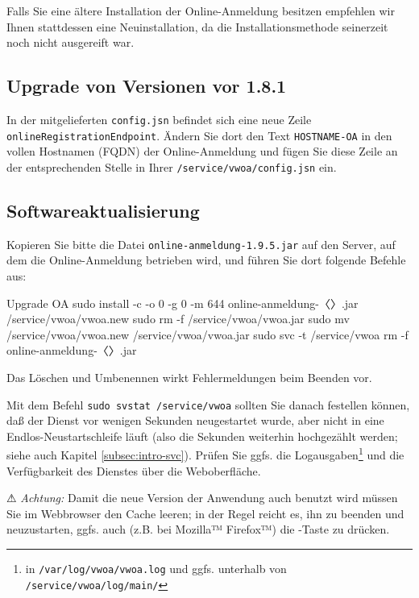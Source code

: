 \documentclass{tarentanleitung}
\newcommand{\vwiaverssw}{1.9.5}
\begin{document}
Falls Sie eine ältere Installation der Online-Anmeldung besitzen
empfehlen wir Ihnen stattdessen eine Neuinstallation, da die
Installationsmethode seinerzeit noch nicht ausgereift war.

\subsection{Upgrade von Versionen vor 1.8.1}\label{subsec:upgrade-oa-181}

In der mitgelieferten \texttt{config.jsn} befindet sich eine neue
Zeile \texttt{onlineRegistrationEndpoint}. Ändern Sie dort den Text
\texttt{HOSTNAME-OA} in den vollen Hostnamen (FQDN) der Online-Anmeldung
und fügen Sie diese Zeile an der entsprechenden Stelle in Ihrer
\texttt{/service/vwoa/config.jsn} ein.

\subsection{Softwareaktualisierung}\label{subsec:upgrade-oa-software}

\begin{minipage}{\linewidth}
Kopieren Sie bitte die Datei \texttt{online-anmeldung-\vwiaverssw{}.jar}
auf den Server, auf dem die Online-Anmeldung betrieben wird, und führen
Sie dort folgende Befehle aus:

\begin{lstdump}{Upgrade OA}
sudo install -c -o 0 -g 0 -m 644 online-anmeldung-〈\lstdumpesc{\vwiaverssw}〉.jar /service/vwoa/vwoa.new
sudo rm -f /service/vwoa/vwoa.jar
sudo mv /service/vwoa/vwoa.new /service/vwoa/vwoa.jar
sudo svc -t /service/vwoa
rm -f online-anmeldung-〈\lstdumpesc{\vwiaverssw}〉.jar
\end{lstdump}

Das Löschen und Umbenennen wirkt Fehlermeldungen beim Beenden vor.
\end{minipage}

Mit dem Befehl \texttt{sudo svstat /service/vwoa} sollten Sie
danach festellen können, daß der Dienst vor wenigen Sekunden
neugestartet wurde, aber nicht in eine Endlos-Neustartschleife
läuft (also die Sekunden weiterhin hochgezählt werden; siehe
auch Kapitel \ref{subsec:intro-svc}). Prüfen Sie ggfs. die
Logausgaben\Hair\footnote{\label{fn:vwoalogs}in
\texttt{/var/log/vwoa/vwoa.log} und ggfs. unterhalb von
\texttt{/service/vwoa/log/main/}} und die Verfügbarkeit des
Dienstes über die Weboberfläche.

⚠ \emph{Achtung:} Damit die neue Version der Anwendung auch
benutzt wird müssen Sie im Webbrowser den Cache leeren; in
der Regel reicht es, ihn zu beenden und neuzustarten, ggfs.
auch (z.B. bei Mozilla™ Firefox™) die -Taste
zu drücken.
\end{document}
